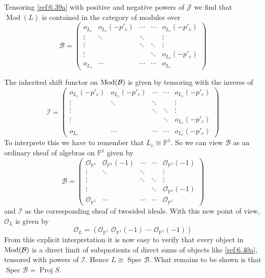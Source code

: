 \documentclass{amsproc}
\def \PP{{\mathbb P}}
\def\Bscr{{\mathcal B}}
\def\Iscr{{\mathcal I}}
\def\Jscr{{\mathcal J}}
\def\Oscr{{\mathcal O}}
\def\Mod{\mathop{\text{Mod}}}
\def\Spec{\operatorname {Spec}}
\def\Proj{\operatorname {Proj}}
\def\Qch{\operatorname {Mod}}
\let\oldtext\text
\def\text#1{\oldtext{\upshape #1}}
\theoremstyle{definition}
\theoremstyle{remark}
\numberwithin{equation}{section}
\numberwithin{table}{section}
\numberwithin{figure}{section}
\begin{document}
Tensoring \eqref{ref:6.39a} with positive and negative powers of
$\Jscr$ we find that $\Qch(L)$ is contained in the category of modules
over
\[
\Bscr=\begin{pmatrix}
  o_{L_c}  &o_{L_c}(-p'_c)
  &\cdots &\cdots &o_{L_c}(-p'_c) \\
 \vdots &\ddots
  &\ddots & &\vdots \\ \vdots & &\ddots &\ddots &\vdots \\ 
\vdots & &
  &\ddots & o_{L_c}(-p'_c) 
\\
 o_{L_c} &\cdots
  &\cdots &\cdots &o_{L_c}
\end{pmatrix}
\]

The inherited shift functor on $\Mod(\Bscr)$ is given by tensoring
with the inverse of 
\[
\Iscr=
\begin{pmatrix}
  o_{L_c}(-p'_c)  &o_{L_c}(-p'_c)
  &\cdots &\cdots &o_{L_c}(-p'_c) \\
 \vdots &\ddots
  &\ddots & &\vdots \\ \vdots & &\ddots &\ddots &\vdots \\ 
\vdots & &
  &\ddots & o_{L_c}(-p'_c) 
\\
 o_{L_c} &\cdots
  &\cdots &\cdots &o_{L_c}(-p'_c)
\end{pmatrix}
\]
To interprete this we have to remember that $L_c\cong \PP^1$. So we
can view $\Bscr$ as an ordinary sheaf of algebras on $\PP^1$ 
given by
\[
\Bscr=\begin{pmatrix}
 \Oscr_{\PP^1}  &\Oscr_{\PP^1}(-1)
  &\cdots &\cdots &\Oscr_{\PP^1}(-1) \\
 \vdots &\ddots
  &\ddots & &\vdots \\ \vdots & &\ddots &\ddots &\vdots \\ 
\vdots & &
  &\ddots & \Oscr_{\PP^1}(-1)
\\
\Oscr_{\PP^1} &\cdots
  &\cdots &\cdots &\Oscr_{\PP^1}
\end{pmatrix}
\]
and
$\Iscr$ as the corresponding sheaf of twosided ideals. With this new
point of view, $\Oscr_L$ is given by
\begin{equation}
\label{ref:6.40a}
\Oscr_L=(\Oscr_{\PP^1} \,\,\Oscr_{\PP^1}(-1)\,\,\cdots\,\,
\Oscr_{\PP^1}(-1))
\end{equation}
From this explicit interpretation it is now easy to verify that every
object in $\Mod(\Bscr)$ is a direct limit of subquotients of direct
sums of objects like \eqref{ref:6.40a}, tensored with powers of
$\Iscr$. Hence $L\cong \Spec \Bscr$. What remains to be shown is that
$\Spec \Bscr=\Proj S$.
\end{document}
